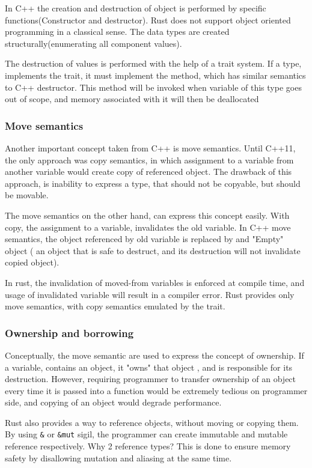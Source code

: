 In C++ the creation and destruction of object is performed by specific functions(Constructor and destructor). Rust does
not support object oriented programming in a classical sense. The data types are created structurally(enumerating all component values).

The destruction of values is performed with the help of a trait system. If a type, implements the  trait,
it must implement the  method, which has similar semantics to C++ destructor. This method will be invoked
when variable of this type goes out of scope, and memory associated with it will then be deallocated

\subsubsection{Move semantics}
Another important concept taken from C++ is move semantics. Until C++11, the only approach was copy semantics, in which
assignment to a variable from another variable would create copy of referenced object.
The drawback of this approach, is inability to express a type, that should not be copyable, but should be movable.

The move semantics on the other hand, can express this concept easily. With copy, the assignment to a variable, invalidates the
old variable. In C++ move semantics, the object referenced by old variable is replaced by and "Empty" object ( an object
that is safe to destruct, and its destruction will not invalidate copied object).

In rust, the invalidation of moved-from variables is enforced at compile time, and usage of invalidated variable will result in a
compiler error. Rust provides only move semantics, with copy semantics emulated by the  trait.

\subsubsection{Ownership and borrowing}
Conceptually, the move semantic are used to express the concept of ownership. If a variable, contains an object, it "owns"
that object , and is responsible for its destruction. However, requiring programmer to transfer ownership of an object every time
it is passed into a function would be extremely tedious on programmer side, and copying of an object would degrade performance.

Rust also provides a way to reference objects, without moving or copying them. By using \verb|&| or
\verb|&mut| sigil, the programmer can create immutable and mutable reference respectively. Why 2 reference types? This is
done to ensure memory safety by disallowing mutation and aliasing at the same time.

